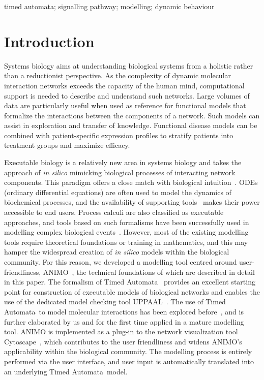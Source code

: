 \documentclass[journal, 10pt]{IEEEtran}
\def\tas{Timed Automata}
\begin{document}
\begin{IEEEkeywords}
 timed automata; signalling pathway; modelling; dynamic behaviour
\end{IEEEkeywords}

\IEEEpeerreviewmaketitle


\section{Introduction}\label{sec:introduction}

Systems biology aims at understanding biological systems from a holistic rather than a reductionist perspective.
As the complexity of dynamic molecular interaction networks exceeds the capacity of the human mind, 
computational support is needed to describe and understand such networks.
Large volumes of data are particularly useful when used as reference for functional models
that formalize the interactions between the components of a network.
Such models can assist in exploration and transfer of knowledge. 
Functional disease models can be combined with patient-specific expression profiles to stratify 
patients into treatment groups and maximize efficacy.

Executable biology is a relatively new area in systems biology and takes the approach of \emph{in silico} mimicking biological processes of interacting 
network components. This paradigm offers a close match with biological intuition~\cite{ex-bio}.
ODEs (ordinary differential equations) are often used to model the dynamics of biochemical processes,
and the availability of supporting tools~\cite{copasi,gna,e-cell} makes their power accessible to end users.
Process calculi are also classified as executable approaches, and tools based on such formalisms have been successfully
used in modelling complex biological events~\cite{biopepa-nfkb,blenx-parkinson}.
However, most of the existing modelling tools require theoretical foundations or training in mathematics,
and this may hamper the widespread creation of \emph{in silico} models within the biological community.
For this reason, we developed a modelling tool centred around user-friendliness, ANIMO~\cite{animo-site}, the technical foundations of which are described 
in detail in this paper. The formalism of \tas~\cite{timed-automata-alur} provides an excellent starting point for 
construction of executable models of biological networks and enables the use of the dedicated model checking tool UPPAAL~\cite{uppaal}.
The use of \tas\ to model molecular interactions has been explored before~\cite{bartocci-oscillators,ta-siebert,oded-ta-discretization}, and is further elaborated by us 
and for the first time applied in a mature modelling tool. ANIMO is implemented as a plug-in to the 
network visualization tool Cytoscape~\cite{cytoscape}, which contributes to the user friendliness and widens ANIMO's 
applicability within the biological community. The modelling process is entirely performed via the user interface, and user input is 
automatically translated into an underlying \tas\ model.
\end{document}

